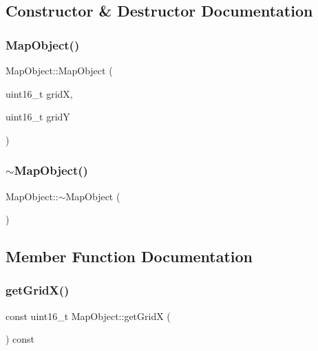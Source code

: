 \subsection{Constructor \& Destructor Documentation}
\mbox{\label{class_map_object_ae06479f6095fd54700ca5d60f69de5b6}} 
\subsubsection{\texorpdfstring{Map\+Object()}{MapObject()}}
{\footnotesize\ttfamily Map\+Object\+::\+Map\+Object (\begin{DoxyParamCaption}\item[{uint16\+\_\+t}]{gridX,  }\item[{uint16\+\_\+t}]{gridY }\end{DoxyParamCaption})}

\mbox{\label{class_map_object_aa601344267a49df197e841fcbd732209}} 
\subsubsection{\texorpdfstring{$\sim$\+Map\+Object()}{~MapObject()}}
{\footnotesize\ttfamily Map\+Object\+::$\sim$\+Map\+Object (\begin{DoxyParamCaption}{ }\end{DoxyParamCaption})\hspace{0.3cm}{\ttfamily [virtual]}}



\subsection{Member Function Documentation}
\mbox{\label{class_map_object_af738e8dcd18425f599c94c9951ed94bb}} 
\subsubsection{\texorpdfstring{get\+Grid\+X()}{getGridX()}}
{\footnotesize\ttfamily const uint16\+\_\+t Map\+Object\+::get\+GridX (\begin{DoxyParamCaption}{ }\end{DoxyParamCaption}) const\hspace{0.3cm}{\ttfamily [inline]}}

